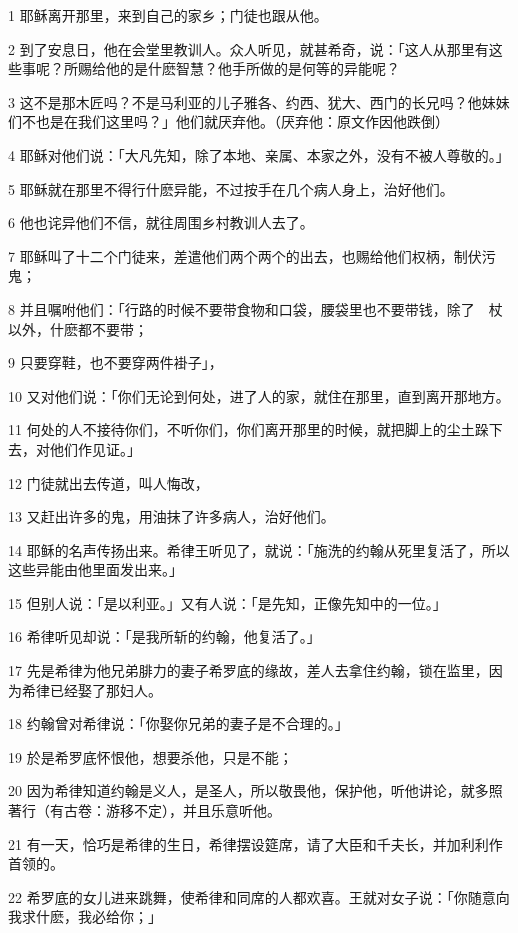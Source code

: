 \par 1 耶稣离开那里，来到自己的家乡；门徒也跟从他。
\par 2 到了安息日，他在会堂里教训人。众人听见，就甚希奇，说：「这人从那里有这些事呢？所赐给他的是什麽智慧？他手所做的是何等的异能呢？
\par 3 这不是那木匠吗？不是马利亚的儿子雅各、约西、犹大、西门的长兄吗？他妹妹们不也是在我们这里吗？」他们就厌弃他。（厌弃他：原文作因他跌倒）
\par 4 耶稣对他们说：「大凡先知，除了本地、亲属、本家之外，没有不被人尊敬的。」
\par 5 耶稣就在那里不得行什麽异能，不过按手在几个病人身上，治好他们。
\par 6 他也诧异他们不信，就往周围乡村教训人去了。
\par 7 耶稣叫了十二个门徒来，差遣他们两个两个的出去，也赐给他们权柄，制伏污鬼；
\par 8 并且嘱咐他们：「行路的时候不要带食物和口袋，腰袋里也不要带钱，除了　杖以外，什麽都不要带；
\par 9 只要穿鞋，也不要穿两件褂子」，
\par 10 又对他们说：「你们无论到何处，进了人的家，就住在那里，直到离开那地方。
\par 11 何处的人不接待你们，不听你们，你们离开那里的时候，就把脚上的尘土跺下去，对他们作见证。」
\par 12 门徒就出去传道，叫人悔改，
\par 13 又赶出许多的鬼，用油抹了许多病人，治好他们。
\par 14 耶稣的名声传扬出来。希律王听见了，就说：「施洗的约翰从死里复活了，所以这些异能由他里面发出来。」
\par 15 但别人说：「是以利亚。」又有人说：「是先知，正像先知中的一位。」
\par 16 希律听见却说：「是我所斩的约翰，他复活了。」
\par 17 先是希律为他兄弟腓力的妻子希罗底的缘故，差人去拿住约翰，锁在监里，因为希律已经娶了那妇人。
\par 18 约翰曾对希律说：「你娶你兄弟的妻子是不合理的。」
\par 19 於是希罗底怀恨他，想要杀他，只是不能；
\par 20 因为希律知道约翰是义人，是圣人，所以敬畏他，保护他，听他讲论，就多照著行（有古卷：游移不定），并且乐意听他。
\par 21 有一天，恰巧是希律的生日，希律摆设筵席，请了大臣和千夫长，并加利利作首领的。
\par 22 希罗底的女儿进来跳舞，使希律和同席的人都欢喜。王就对女子说：「你随意向我求什麽，我必给你；」
